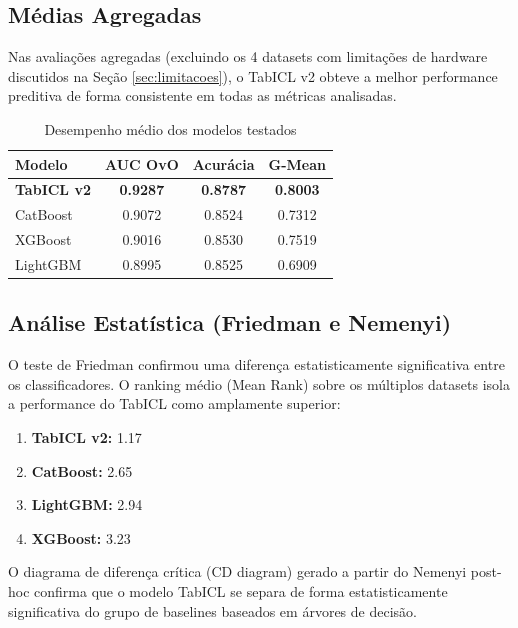 \documentclass[12pt,a4paper]{article}
\begin{document}
\subsection{Médias Agregadas}
Nas avaliações agregadas (excluindo os 4 datasets com limitações de hardware discutidos na Seção \ref{sec:limitacoes}), o TabICL v2 obteve a melhor performance preditiva de forma consistente em todas as métricas analisadas.

\begin{table}[h]
\centering
\caption{Desempenho médio dos modelos testados}
\vspace{0.2cm}
\begin{tabular}{@{}lccc@{}}
\toprule
\textbf{Modelo} & \textbf{AUC OvO} & \textbf{Acurácia} & \textbf{G-Mean} \\ \midrule
\textbf{TabICL v2} & \textbf{0.9287} & \textbf{0.8787} & \textbf{0.8003} \\
CatBoost & 0.9072 & 0.8524 & 0.7312 \\
XGBoost & 0.9016 & 0.8530 & 0.7519 \\
LightGBM & 0.8995 & 0.8525 & 0.6909 \\ \bottomrule
\end{tabular}
\end{table}

\subsection{Análise Estatística (Friedman e Nemenyi)}
O teste de Friedman confirmou uma diferença estatisticamente significativa entre os classificadores. O ranking médio (Mean Rank) sobre os múltiplos datasets isola a performance do TabICL como amplamente superior:

\begin{enumerate}
    \item \textbf{TabICL v2:} 1.17
    \item \textbf{CatBoost:} 2.65
    \item \textbf{LightGBM:} 2.94
    \item \textbf{XGBoost:} 3.23
\end{enumerate}

O diagrama de diferença crítica (CD diagram) gerado a partir do Nemenyi post-hoc confirma que o modelo TabICL se separa de forma estatisticamente significativa do grupo de baselines baseados em árvores de decisão.
\end{document}
